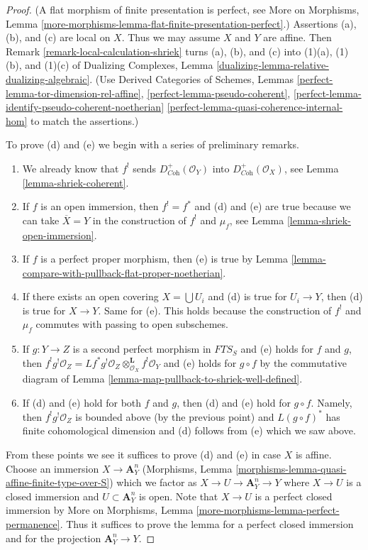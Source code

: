 \documentclass[10pt,a4paper]{amsart}
\theoremstyle{plain}
\theoremstyle{definition}
\theoremstyle{remark}
\numberwithin{equation}{subsection}
\begin{document}
\begin{proof}
(A flat morphism of finite presentation is perfect, see
More on Morphisms, Lemma
\ref{more-morphisms-lemma-flat-finite-presentation-perfect}.)
Assertions (a), (b), and (c) are local on $X$.
Thus we may assume $X$ and $Y$ are affine.
Then Remark \ref{remark-local-calculation-shriek}
turns (a), (b), and (c) into (1)(a), (1)(b), and (1)(c) of
Dualizing Complexes, Lemma \ref{dualizing-lemma-relative-dualizing-algebraic}.
(Use Derived Categories of Schemes, Lemmas
\ref{perfect-lemma-tor-dimension-rel-affine},
\ref{perfect-lemma-pseudo-coherent},
\ref{perfect-lemma-identify-pseudo-coherent-noetherian}
\ref{perfect-lemma-quasi-coherence-internal-hom} to match the assertions.)

\medskip\noindent
To prove (d) and (e) we begin with a series of preliminary remarks.
\begin{enumerate}
\item We already know that $f^!$ sends $D_{\textit{Coh}}^+(\mathcal{O}_Y)$
into $D_{\textit{Coh}}^+(\mathcal{O}_X)$, see
Lemma \ref{lemma-shriek-coherent}.
\item If $f$ is an open immersion, then $f^! = f^*$ and (d) and (e)
are true because we can take $\overline{X} = Y$ in the construction
of $f^!$ and $\mu_f$, see Lemma \ref{lemma-shriek-open-immersion}.
\item If $f$ is a perfect proper morphism, then (e) is true by
Lemma \ref{lemma-compare-with-pullback-flat-proper-noetherian}.
\item If there exists an open covering $X = \bigcup U_i$ and (d) is
true for $U_i \to Y$, then (d) is true for $X \to Y$. Same for (e).
This holds because the construction of $f^!$ and $\mu_f$ commutes
with passing to open subschemes.
\item If $g : Y \to Z$ is a second perfect morphism in $\textit{FTS}_S$
and (e) holds for $f$ and $g$, then
$f^!g^!\mathcal{O}_Z =
Lf^*g^!\mathcal{O}_Z \otimes_{\mathcal{O}_X}^\mathbf{L} f^!\mathcal{O}_Y$
and (e) holds for $g \circ f$ by the commutative diagram
of Lemma \ref{lemma-map-pullback-to-shriek-well-defined}.
\item If (d) and (e) hold for both $f$ and $g$, then
(d) and (e) hold for $g \circ f$. Namely, then $f^!g^!\mathcal{O}_Z$
is bounded above (by the previous point) and $L(g \circ f)^*$ has finite
cohomological dimension and (d) follows from (e) which we saw above.
\end{enumerate}
From these points we see it suffices to prove (d) and (e) in case $X$ is
affine. Choose an immersion $X \to \mathbf{A}^n_Y$
(Morphisms, Lemma \ref{morphisms-lemma-quasi-affine-finite-type-over-S})
which we factor as $X \to U \to \mathbf{A}^n_Y \to Y$ where $X \to U$
is a closed immersion and $U \subset \mathbf{A}^n_Y$ is open.
Note that $X \to U$ is a perfect closed immersion by
More on Morphisms, Lemma \ref{more-morphisms-lemma-perfect-permanence}.
Thus it suffices to prove the lemma for a perfect closed immersion
and for the projection $\mathbf{A}^n_Y \to Y$.


\end{proof}
\end{document}

